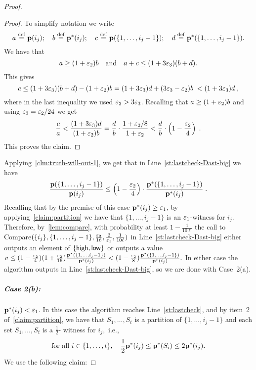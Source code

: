 \begin{proof}
\begin{proof} To simplify notation we write
\[
a \stackrel{\rm def}{=} \mathbf{p}(i_j); \quad b \stackrel{\rm def}{=} \mathbf{p}^\ast(i_j); \quad
c \stackrel{\rm def}{=} \mathbf{p}(\{1,\dots,i_j-1\}); \quad d \stackrel{\rm def}{=} \mathbf{p}^\ast(\{1,\dots,i_j-1\}).
\]
We have that
\begin{equation}
\label{eq:abcd}
a \geq (1+{\varepsilon_2})b \quad \text{and} \quad a+c \leq (1 + 3{\varepsilon_3}) (b+d).
\end{equation}
This gives
\begin{equation} \label{eq:z1}
c \leq (1+3 {\varepsilon_3}) (b+d) - (1+{\varepsilon_2})b = (1+3{\varepsilon_3})d + (3{\varepsilon_3} - {\varepsilon_2})b \;< (1+3{\varepsilon_3})d\;,
\end{equation}
where in the last inequality we used $\varepsilon_2 > 3\varepsilon_3$.
Recalling that $a \geq (1+{\varepsilon_2})b$ and using $\varepsilon_3 = \varepsilon_2/24$ we get
\begin{equation}
\frac{c}{a} < \frac{(1+3{\varepsilon_3})d}{(1+{\varepsilon_2})b} = \frac{d}{b}\cdot \frac{1+\varepsilon_2/8}{1+\varepsilon_2}
          < \frac{d}{b}\cdot \left(1-\frac{\varepsilon_2}{4}\right)\;.
\end{equation}
This proves the claim.
\end{proof}

Applying~\cref{clm:truth-will-out-1}, we get that
in Line~\ref{st:lastcheck-Dast-big} we have
\begin{equation}
{\frac {\ensuremath{\mathbf{p}}(\{1,\dots,i_j-1\})}{\ensuremath{\mathbf{p}}(i_j)}} \leq
  \left(1 - {\frac {{\varepsilon_2}} 4} \right) \cdot
   {\frac {\ensuremath{\mathbf{p}}^\ast(\{1,\dots,i_j-1\})}{\ensuremath{\mathbf{p}}^\ast(i_j)}}\;.
\end{equation}
Recalling that by the premise of this case $\D^\ast(i_j) \geq {\eps_1}$,
by applying~\cref{claim:partition} we have that
\mbox{$\{1,\dots,i_j-1\}$} is an ${\varepsilon_1}$-\good witness for $i_j$.
Therefore, by~\cref{lem:compare}, with probability at least $1 - {\frac{1}{10\ell}}$
the call to {\sc Compare}$(\{i_j\},\{1,\dots,i_j-1\},{\frac {{\varepsilon_2}}{16}},
\frac{2}{\varepsilon_1}, {\frac{1}{10 \ell}})$ in Line~\ref{st:lastcheck-Dast-big}
either outputs an element of $\{{\textsf{high}},{\textsf{low}}\}$ or outputs a value
$v \leq (1 - {\frac {{\varepsilon_2}} 4}) (1 + {\frac {{\varepsilon_2}}{16}})
{\frac {\mathbf{p}^\ast(\{1,\dots,i_j-1\})}{\mathbf{p}^\ast(i_j)}}
<
(1 - {\frac {{\varepsilon_2}}{8}})
{\frac {\mathbf{p}^\ast(\{1,\dots,i_j-1\})}{\mathbf{p}^\ast(i_j)}}.
$
In either case the algorithm outputs \reject in
Line~\ref{st:lastcheck-Dast-big}, so we are done with Case~2(a).

\medskip

\subparagraph{Case 2(b):}  $\mathbf{p}^\ast(i_j) < {\varepsilon_1}$.
In this case the algorithm reaches Line~\ref{st:lastcheck}, and by
item~2 of~\cref{claim:partition}, we have
that $S_1,\dots,S_t$ is a partition of
$\{1,\dots,i_j-1\}$ and
each set $S_1,\dots,S_t$ is a ${\frac{1}2}$-\good
witness for $i_j,$ i.e.,
\begin{equation}
\label{eq:construction}
\text{for all~}i \in \{1,\dots,t\}, \quad
{\frac{1}2} \mathbf{p}^\ast(i_j) \leq \mathbf{p}^\ast(S_i) \leq 2 \mathbf{p}^\ast(i_j).
\end{equation}
We use the following claim:


\end{proof}
